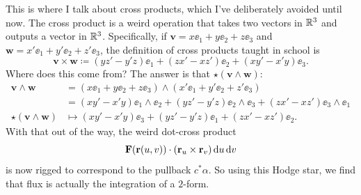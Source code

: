 \begin{itemize}
	This is where I talk about cross products, which I've deliberately avoided until now.
	The cross product is a weird operation that takes two vectors in $\mathbb R^3$
	and outputs a vector in $\mathbb R^3$.
	Specifically, if $\mathbf{v} = x \ee_1 + y \ee_2 + z \ee_3$
	and $\mathbf{w} = x' \ee_1 + y' \ee_2 + z' \ee_3$,
	the definition of cross products taught in school is
	\[ \mathbf{v} \times \mathbf{w} \coloneqq (yz'-y'z) \ee_1 + (zx'-xz') \ee_2 + (xy'-x'y) \ee_3. \]
	Where does this come from?
	The answer is that $\star(\mathbf{v} \wedge \mathbf{w})$:
	\begin{align*}
		\mathbf{v} \wedge \mathbf{w} &=
		(x \ee_1 + y \ee_2 + z \ee_3) \wedge (x' \ee_1 + y' \ee_2 + z' \ee_3) \\
		&= (xy'-x'y) \ee_1 \wedge \ee_2
		+ (yz'-y'z) \ee_2 \wedge \ee_3
		+ (zx'-xz') \ee_3 \wedge \ee_1 \\
		\star(\mathbf{v} \wedge \mathbf{w})
		&\mapsto (xy'-x'y) \ee_3
		+ (yz'-y'z) \ee_1
		+ (zx'-xz') \ee_2.
	\end{align*}
	With that out of the way, the weird dot-cross product
	\[ \mathbf{F}(\mathbf{r}(u,v)) \cdot \left( \mathbf{r}_u \times \mathbf{r}_v \right) \odif{u} \odif{v} \]
	is now rigged to correspond to the pullback $c^\ast\alpha$.
	So using this Hodge star, we find that flux is actually the integration of a $2$-form.
\end{itemize}

